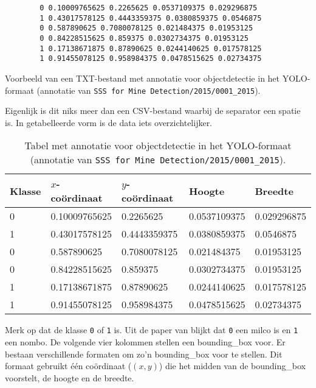 \begin{listing}[H]
    \begin{verbatim}
        0 0.10009765625 0.2265625 0.0537109375 0.029296875
        1 0.43017578125 0.4443359375 0.0380859375 0.0546875
        0 0.587890625 0.7080078125 0.021484375 0.01953125
        0 0.84228515625 0.859375 0.0302734375 0.01953125
        1 0.17138671875 0.87890625 0.0244140625 0.017578125
        1 0.91455078125 0.958984375 0.0478515625 0.02734375
    \end{verbatim}
    \caption[YOLO-annotatie]{Voorbeeld van een TXT-bestand met annotatie voor objectdetectie in het YOLO-formaat (annotatie van \texttt{SSS for Mine Detection/2015/0001\_2015}). \autocite{Pessanha_Santos_2024_SSSFMD}}
\end{listing}

Eigenlijk is dit niks meer dan een CSV-bestand waarbij de separator een spatie is. In getabelleerde vorm is de data iets overzichtelijker.

\begin{table}[H]
    \centering
    \begin{tabular}{lllll}
        \toprule
        \textbf{Klasse} & \textbf{$x$-coördinaat} & \textbf{$y$-coördinaat} & \textbf{Hoogte} & \textbf{Breedte} \\
        \midrule
        0 & 0.10009765625 & 0.2265625    & 0.0537109375 & 0.029296875 \\
        1 & 0.43017578125 & 0.4443359375 & 0.0380859375 & 0.0546875   \\
        0 & 0.587890625   & 0.7080078125 & 0.021484375  & 0.01953125  \\
        0 & 0.84228515625 & 0.859375     & 0.0302734375 & 0.01953125  \\
        1 & 0.17138671875 & 0.87890625   & 0.0244140625 & 0.017578125 \\
        1 & 0.91455078125 & 0.958984375  & 0.0478515625 & 0.02734375  \\
        \bottomrule
    \end{tabular}
    \caption[YOLO-annotatie in getabelleerde vorm]{\label{tab:yolo_annot_table} Tabel met annotatie voor objectdetectie in het YOLO-formaat (annotatie van \texttt{SSS for Mine Detection/2015/0001\_2015}). \autocite{Pessanha_Santos_2024_SSSFMD}}
\end{table}

Merk op dat de klasse \texttt{0} of \texttt{1} is. Uit de paper van \textcite{Pessanha_Santos_2024} blijkt dat \texttt{0} een \gls{milco} is en \texttt{1} een \gls{nombo}. De volgende vier kolommen stellen een \gls{bounding_box} voor. Er bestaan verschillende formaten om zo'n \gls{bounding_box} voor te stellen. Dit formaat gebruikt één coördinaat ($(x, y)$) die het midden van de \gls{bounding_box} voorstelt, de hoogte en de breedte. \\

